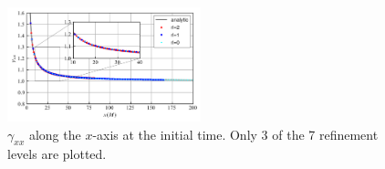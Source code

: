 \documentclass[%
 reprint,
 amsmath,amssymb,
 aps,
 prd,
]{revtex4-2}
\begin{document}
\begin{figure}[ht!]
	\includegraphics[width=0.5\textwidth]{data/gammaxx.png}%
	\caption{\label{fig:gammaxx} $\gamma_{xx}$ along the $x$-axis at the initial time. Only 3 of the 7 refinement levels are plotted.}
\end{figure}

%
%
%
%
\end{document}
